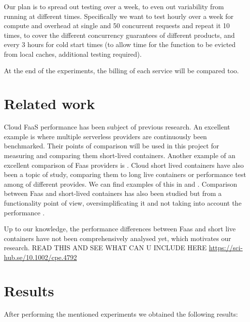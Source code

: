 \documentclass[11pt]{article}
\begin{document}
Our plan is to spread out testing over a week, to even out variability from running at different times. Specifically we want to test hourly over a week for compute and overhead at single and 50 concurrent requests and repeat it 10 times, to cover the different concurrency guarantees of different products, and every 3 hours for cold start times (to allow time for the function to be evicted from local caches, additional testing required).

At the end of the experiments, the billing of each service will be compared too.






\section{Related work}
Cloud FaaS performance has been subject of previous research. An excellent example is \cite{aa} where multiple serverless providers are continuously been benchmarked. Their points of comparison will be used in this project for measuring and comparing them short-lived containers. Another example of an excellent comparison of Faas providers is \cite{bb}. Cloud short lived containers have also been a topic of study, comparing them to long live containers or performance test among of different provides. We can find examples of this in \cite{cc} and \cite{dd}. Comparison between Faas and short-lived containers has also been studied but from a functionality point of view, oversimplificating it and not taking into account the performance \cite{ee}\cite{ff}\cite{gg}.

Up to our knowledge, the performance differences between Faas and short live containers have not been comprehensively analysed yet, which motivates our research.
READ THIS AND SEE WHAT CAN U INCLUDE HERE
\url{https://sci-hub.se/10.1002/cpe.4792}


\section{Results}
After performing the mentioned experiments we obtained the following results:


\end{document}

